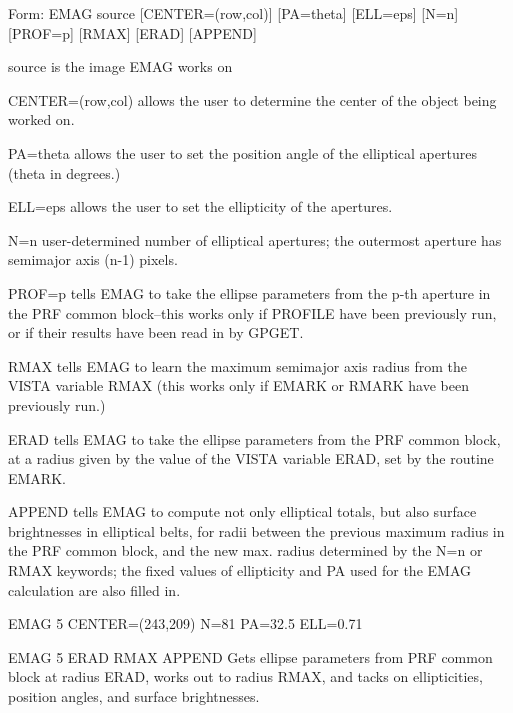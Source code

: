 {\newpage\clearpage
{}%
\begin{command}
  \item[Form: EMAG source {[CENTER=(row,col)]} {[PA=theta]} {[ELL=eps]} {[N=n]}
     {[PROF=p]} {[RMAX]} {[ERAD]} {[APPEND]}\hfill]{}
  \item[source]{is the image EMAG works on}
  \item[CENTER=(row,col)]{allows the user to determine the center
       of the object being worked on.}
  \item[PA=theta]{allows the user to set the position angle of
       the elliptical apertures (theta in degrees.)}
  \item[ELL=eps]{allows the user to set the ellipticity of the
       apertures.}
  \item[N=n]{user-determined number of elliptical apertures;
       the outermost aperture has semimajor axis (n-1) pixels.}
  \item[PROF=p]{tells EMAG to take the ellipse parameters from the p-th
       aperture in the PRF common block--this works only if PROFILE have
       been previously run, or if their results have been read in by
       GPGET.}
  \item[RMAX]{tells EMAG to learn the maximum semimajor axis radius from
       the VISTA variable RMAX (this works only if EMARK or RMARK have been
       previously run.)}
  \item[ERAD]{tells EMAG to take the ellipse parameters from the PRF common
       block, at a radius given by the value of the VISTA variable ERAD,
       set by the routine EMARK.}
  \item[APPEND]{tells EMAG to compute not only elliptical totals, but also
       surface brightnesses in elliptical belts, for radii between the
       previous maximum radius in the PRF common block, and the new
       max. radius determined by the N=n or RMAX keywords; the fixed values
       of ellipticity and PA used for the EMAG calculation are also filled
       in.}
\end{command}%
\lthtmlfigureZ
\lthtmlcheckvsize\clearpage}

{\newpage\clearpage
{}%
\begin{example}
  \item[EMAG 5 CENTER=(243,209) N=81 PA=32.5 ELL=0.71\hfill]{}
\par
\item[EMAG 5 ERAD RMAX APPEND\hfill]{Gets ellipse parameters from PRF
       common block at radius ERAD, works out to radius RMAX, and tacks on
       ellipticities, position angles, and surface brightnesses.}
\end{example}%
\lthtmlfigureZ
\lthtmlcheckvsize\clearpage}

